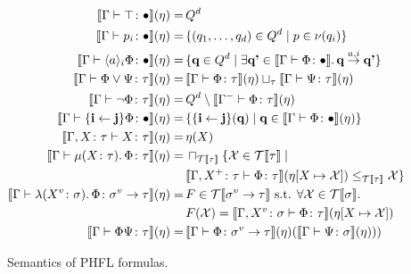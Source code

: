 \begin{figure}
    \caption{Semantics of PHFL formulas.}
    \label{figure:phfl-semantics}
    \begin{align*}
        \llbracket \Gamma \vdash \top \colon \bullet \rrbracket(\eta) =\,& Q^d\\
        \llbracket \Gamma \vdash p_i \colon \bullet \rrbracket(\eta) =\,& \{(q_1, \dots, q_d) \in Q^d \mid p \in \nu
        (q_i)\}\\
        \llbracket \Gamma \vdash \langle a \rangle_i \Phi \colon \bullet \rrbracket(\eta) =\,& \{\emph{q} \in Q^d \mid
        \exists \emph{q'} \in \llbracket \Gamma \vdash \Phi \colon \bullet \rrbracket.\,\emph{q}
        \overset{a, i}{\rightarrow} \emph{q'}\}\\
        \llbracket \Gamma \vdash \Phi \vee \Psi \colon \tau \rrbracket(\eta) =\,& \llbracket \Gamma \vdash \Phi
        \colon \tau \rrbracket (\eta) \sqcup_\tau \llbracket \Gamma \vdash \Psi \colon \tau \rrbracket (\eta)\\
        \llbracket \Gamma \vdash \neg \Phi \colon \tau \rrbracket(\eta) =\,& Q^d \setminus \llbracket \Gamma^- \vdash \Phi
        \colon \tau \rrbracket (\eta)\\
        \llbracket \Gamma \vdash \{\emph{i} \leftarrow \emph{j}\} \Phi \colon \bullet \rrbracket(\eta) =\,&
        \{\{\emph{i} \leftarrow \emph{j}\}(\emph{q}) \mid \emph{q} \in \llbracket \Gamma \vdash \Phi \colon \bullet
        \rrbracket (\eta)\}\\
        \llbracket \Gamma, X \colon \tau \vdash X \colon \tau \rrbracket(\eta) =\,& \eta(X)\\
        \llbracket \Gamma \vdash \mu (X \colon \tau).\,\Phi \colon \tau \rrbracket(\eta) =\,&
        \sqcap_{\mathcal{T}\llbracket\tau\rrbracket} \{\mathcal{X} \in \mathcal{T}\llbracket \tau \rrbracket \mid \\
        &\llbracket \Gamma, X^+ \colon \tau \vdash \Phi \colon \tau \rrbracket(\eta[X \mapsto \mathcal{X}])
        \leq_{\mathcal{T}\llbracket \tau \rrbracket} \mathcal{X}\}\\
        \llbracket \Gamma \vdash \lambda (X^v \colon \sigma).\,\Phi \colon \sigma^v \rightarrow \tau \rrbracket
        (\eta) =\,& F \in \mathcal{T}\llbracket \sigma^v \rightarrow \tau \rrbracket \text{ s.t. } \forall
        \mathcal{X} \in \mathcal{T}\llbracket \sigma \rrbracket.\, \\
        &F(\mathcal{X}) = \llbracket \Gamma, X^v
        \colon \sigma \vdash \Phi \colon \tau \rrbracket (\eta[X \mapsto \mathcal{X}])\\
        \llbracket \Gamma \vdash \Phi \Psi \colon \tau \rrbracket(\eta) =\,& \llbracket \Gamma \vdash \Phi \colon \sigma
        ^v \rightarrow \tau \rrbracket (\eta)(\llbracket \Gamma \vdash \Psi \colon \sigma \rrbracket (\eta)))
    \end{align*}
\end{figure}


